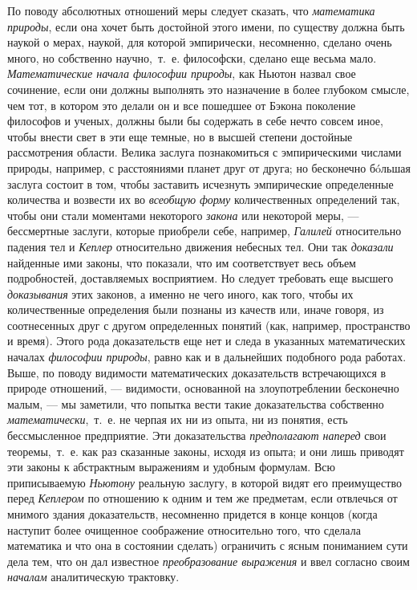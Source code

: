 По поводу абсолютных отношений меры следует сказать, что
{\em математика природы}, если она хочет быть достойной
этого имени, по существу должна быть наукой о мерах, наукой, для которой
эмпирически, несомненно, сделано очень много, но собственно научно,~т.~е.
философски, сделано еще весьма мало.
{\em Математические начала философии природы}, как
Ньютон назвал свое сочинение, если они должны выполнять это назначение в
более глубоком смысле, чем тот, в котором это делали он и все пошедшее от
Бэкона поколение философов и ученых, должны были бы содержать в себе нечто
совсем иное, чтобы внести свет в эти еще темные, но в высшей степени
достойные рассмотрения области. Велика заслуга познакомиться с
эмпирическими числами природы, например, с расстояниями планет друг от
друга; но бесконечно бóльшая заслуга состоит в том, чтобы заставить
исчезнуть эмпирические определенные количества и возвести их во
{\em всеобщую форму} количественных определений так,
чтобы они стали моментами некоторого {\em закона} или
некоторой меры, — бессмертные заслуги, которые приобрели себе, например,
{\em Галилей} относительно падения тел и
{\em Кеплер} относительно движения небесных тел. Они
так {\em доказали} найденные ими законы, что показали,
что им соответствует весь объем подробностей, доставляемых восприятием. Но
следует требовать еще высшего {\em доказывания} этих
законов, а именно не чего иного, как того, чтобы их количественные
определения были познаны из качеств или, иначе говоря, из соотнесенных друг
с другом определенных понятий (как, например, пространство и время). Этого
рода доказательств еще нет и следа в указанных математических началах
{\em философии природы}, равно как и в дальнейших
подобного рода работах. Выше, по поводу видимости математических
доказательств встречающихся в природе отношений, — видимости, основанной на
злоупотреблении бесконечно малым, — мы заметили, что попытка вести такие
доказательства собственно {\em математически},~т.~е. не
черпая их ни из опыта, ни из понятия, есть бессмысленное предприятие. Эти
доказательства {\em предполагают наперед} свои
теоремы,~т.~е. как раз сказанные законы, исходя из опыта; и они лишь
приводят эти законы к абстрактным выражениям и удобным формулам. Всю
приписываемую {\em Ньютону} реальную заслугу, в которой
видят его преимущество перед {\em Кеплером} по
отношению к одним и тем же предметам, если отвлечься от мнимого здания
доказательств, несомненно придется в конце концов (когда наступит более
очищенное соображение относительно того, что сделала математика и что она в
состоянии сделать) ограничить с ясным пониманием сути дела тем, что он дал
известное {\em преобразование
выражения\footnotemark{}}
 и ввел согласно своим {\em началам} аналитическую
трактовку.

